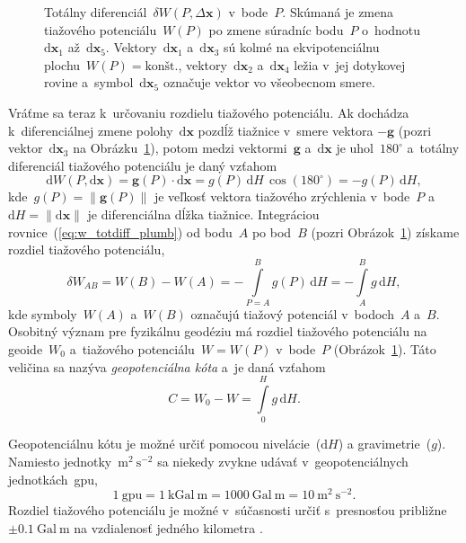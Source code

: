 \documentclass[a4paper,12pt]{book}
\newcommand{\diff}{\mathrm d}
\let\vec\mathbf
\begin{document}
\begin{figure}
\centering

\caption{Totálny diferenciál~$\delta W(P, \Delta \vec x)$ v~bode~$P$.  Skúmaná 
je zmena tiažového potenciálu~$W(P)$ po zmene súradníc bodu~$P$ o~hodnotu 
$\diff \vec x_1$ až~$\diff \vec x_5$.  Vektory~$\diff \vec x_1$ a~$\diff \vec 
x_3$ sú kolmé na ekvipotenciálnu plochu~$W(P) = \textrm{kon\v{s}t.}$, 
vektory~$\diff \vec x_2$ a~$\diff \vec x_4$ ležia v~jej dotykovej rovine 
a~symbol~$\diff \vec x_5$ označuje vektor vo všeobecnom smere.}
\label{fig:total_differential}
\end{figure}

Vráťme sa teraz k~určovaniu rozdielu tiažového potenciálu.  Ak dochádza 
k~diferenciálnej zmene polohy~$\diff \vec x$ pozdĺž tiažnice v~smere vektora 
$-\vec g$ (pozri vektor~$\diff \vec x_3$ na 
Obrázku~\ref{fig:total_differential}), potom medzi vektormi~$\vec g$ a~$\diff 
\vec x$ je uhol~$180^{\circ}$ a~totálny diferenciál tiažového potenciálu je 
daný vzťahom
%
\begin{equation}
\label{eq:w_totdiff_plumb}
\diff W(P, \diff \vec x) = \vec g(P) \cdot \diff \vec x = g(P) \, \diff H \, 
\cos(180^{\circ}) = -g(P) \, \diff H{,}
\end{equation}
%
kde~$g(P) = \| \vec g(P) \|$ je veľkosť vektora tiažového zrýchlenia v~bode~$P$ 
a~$\diff H = \| \diff \vec x \|$ je diferenciálna dĺžka tiažnice.  Integráciou 
rovnice~(\ref{eq:w_totdiff_plumb}) od bodu~$A$ po bod~$B$ (pozri 
Obrázok~\ref{fig:total_differential}) získame rozdiel tiažového potenciálu,
%
\begin{equation}
\label{eq:w_ab}
\delta W_{AB} = W(B) - W(A) = -\int\limits_{P = A}^{B} g(P) \, \diff 
H = -\int\limits_{A}^{B} g \, \diff H{,}
\end{equation}
%
kde symboly~$W(A)$ a~$W(B)$ označujú tiažový potenciál v~bodoch~$A$ a~$B$.  
Osobitný význam pre fyzikálnu geodéziu má rozdiel tiažového potenciálu na 
geoide~$W_0$ a~tiažového potenciálu~$W = W(P)$ v~bode~$P$ 
(Obrázok~\ref{fig:total_differential}).  Táto veličina sa nazýva 
\emph{geopotenciálna kóta} a~je daná vzťahom
%
\begin{equation}
\label{eq:geopotential_number}
C = W_0 - W = \int\limits_0^H g \, \diff H{.}
\end{equation}

Geopotenciálnu kótu je možné určiť pomocou nivelácie~($\diff H$) 
a gravimetrie~($g$).  Namiesto jednotky~$\mathrm{m}^2\ \mathrm{s}^{-2}$ sa 
niekedy zvykne udávať v~geopotenciálnych jednotkách~gpu,
%
\begin{equation}
\label{eq:gpu_unit}
1\ \mathrm{gpu} = 1\ \mathrm{kGal} \ \mathrm{m} = 1000\ \mathrm{Gal}\ 
\mathrm{m} = 10\ \mathrm{m}^2 \ \mathrm{s}^{-2}{.}
\end{equation}
%
Rozdiel tiažového potenciálu je možné v~súčasnosti určiť s~presnosťou približne 
$\pm 0.1\ \mathrm{Gal} \ \mathrm{m}$ na vzdialenosť jedného kilometra 
\parencite{MoritzPhysicalGeodesy}.
\end{document}
